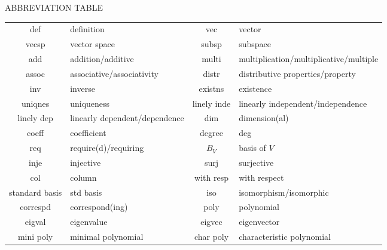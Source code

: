 {\begin{center}
\vspace{24pt}
{\Large A{\normalsize BBREVIATION} T{\normalsize ABLE}}\vspace{8pt}\par
\begin{tabularx}{0.95\textwidth}{
		| c |
		| >{\raggedright\arraybackslash}X | c |
		| >{\raggedright\arraybackslash}X| }
	\hline
def&			definition & vec&			vector\\
vecsp&			vector space & subsp&			subspace\\
add&			addition/additive & multi&			multiplication/multiplicative/multiple\\
assoc&			associative/associativity & distr&			distributive properties/property\\
inv&			inverse & existns&		existence\\
uniqnes&		uniqueness & linely inde&	linearly independent/independence\\
linely dep&		linearly dependent/dependence & dim&			dimension(al)\\
coeff& coefficient & degree& deg\\
req& require(d)/requiring & $B_V$ & basis of $V$\\
inje&			injective & surj&			surjective\\
col&			column & with resp&		with respect\\
standard basis& std basis & iso&			isomorphism/isomorphic\\
correspd&		correspond(ing) & poly&			polynomial\\
eigval&			eigenvalue & eigvec&			eigenvector\\
mini poly&		minimal polynomial & char poly&		characteristic polynomial\\\hline
\end{tabularx}
\end{center}

\clearpage
}{}

\begin{large}




\end{large}


